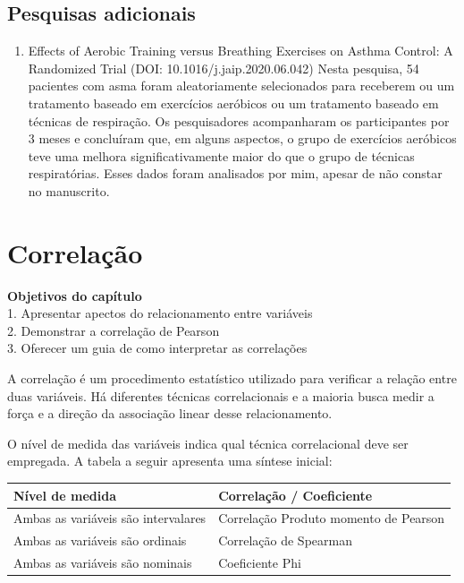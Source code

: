 \documentclass[
]{book}
\providecommand{\tightlist}{%
  \setlength{\itemsep}{0pt}\setlength{\parskip}{0pt}}
\newenvironment{objectives}{
  \definecolor{shadecolor}{rgb}{0.764,0.992,0.686}  %
  \color{black}
  \begin{shaded}}
 {\end{shaded}}
\begin{document}
\hypertarget{pesquisas-adicionais-6}{%
\section{Pesquisas adicionais}\label{pesquisas-adicionais-6}}

\begin{enumerate}
\def\labelenumi{\arabic{enumi}.}
\tightlist
\item
  Effects of Aerobic Training versus Breathing Exercises on Asthma Control: A Randomized Trial (DOI: 10.1016/j.jaip.2020.06.042)
  Nesta pesquisa, 54 pacientes com asma foram aleatoriamente selecionados para receberem ou um tratamento baseado em exercícios aeróbicos ou um tratamento baseado em técnicas de respiração. Os pesquisadores acompanharam os participantes por 3 meses e concluíram que, em alguns aspectos, o grupo de exercícios aeróbicos teve uma melhora significativamente maior do que o grupo de técnicas respiratórias. Esses dados foram analisados por mim, apesar de não constar no manuscrito.
\end{enumerate}

\hypertarget{correlauxe7uxe3o}{%
\chapter{Correlação}\label{correlauxe7uxe3o}}

\begin{objectives}
\textbf{Objetivos do capítulo}\\
1. Apresentar apectos do relacionamento entre variáveis\\
2. Demonstrar a correlação de Pearson\\
3. Oferecer um guia de como interpretar as correlações

\end{objectives}

A correlação é um procedimento estatístico utilizado para verificar a relação entre duas variáveis. Há diferentes técnicas correlacionais e a maioria busca medir a força e a direção da associação linear desse relacionamento.

O nível de medida das variáveis indica qual técnica correlacional deve ser empregada. A tabela a seguir apresenta uma síntese inicial:

\begin{longtable}[]{@{}ll@{}}
\toprule
Nível de medida & Correlação / Coeficiente\tabularnewline
\midrule
\endhead
Ambas as variáveis são intervalares & Correlação Produto momento de Pearson\tabularnewline
Ambas as variáveis são ordinais & Correlação de Spearman\tabularnewline
Ambas as variáveis são nominais & Coeficiente Phi\tabularnewline
\bottomrule
\end{longtable}
\end{document}
